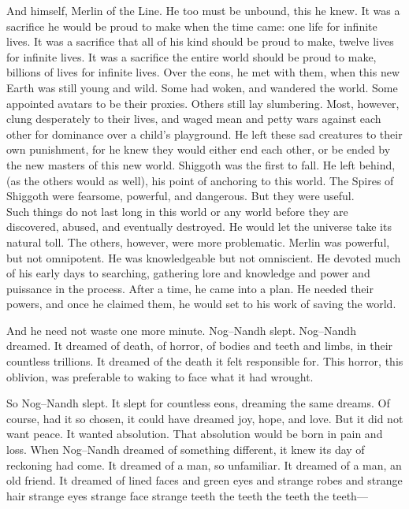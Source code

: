And himself, Merlin of the Line. He too must be unbound, this he knew. It was a sacrifice he would be proud to make when the time came: one life for infinite lives. It was a sacrifice that all of his kind should be proud to make, twelve lives for infinite lives. It was a sacrifice the entire world should be proud to make, billions of lives for infinite lives.
\SmallVSpace
Over the eons, he met with them, when this new Earth was still young and wild. Some had woken, and wandered the world. Some appointed avatars to be their proxies. Others still lay slumbering. Most, however, clung desperately to their lives, and waged mean and petty wars against each other for dominance over a child’s playground. He left these sad creatures to their own punishment, for he knew they would either end each other, or be ended by the new masters of this new world.
\SmallVSpace
Shiggoth was the first to fall. He left behind, (as the others would as well), his point of anchoring to this world. The Spires of Shiggoth were fearsome, powerful, and dangerous. But they were useful.\\Such things do not last long in this world or any world before they are discovered, abused, and eventually destroyed. He would let the universe take its natural toll.
\SmallVSpace
The others, however, were more problematic. Merlin was powerful, but not omnipotent. He was knowledgeable but not omniscient. He devoted much of his early days to searching, gathering lore and knowledge and power and puissance in the process. After a time, he came into a plan. He needed their powers, and once he claimed them, he would set to his work of saving the world.

And he need not waste one more minute.
\doubleline
Nog\mbox{--}Nandh slept. Nog\mbox{--}Nandh dreamed. It dreamed of death, of horror, of bodies and teeth and limbs, in their countless trillions. It dreamed of the death it felt responsible for. This horror, this oblivion, was preferable to waking to face what it had wrought.

So Nog\mbox{--}Nandh slept. It slept for countless eons, dreaming the same dreams. Of course, had it so chosen, it could have dreamed joy, hope, and love. But it did not want peace. It wanted absolution. That absolution would be born in pain and loss.
\SmallVSpace
When Nog\mbox{--}Nandh dreamed of something different, it knew its day of reckoning had come. It dreamed of a man, so unfamiliar. It dreamed of a man, an old friend. It dreamed of lined faces and green eyes and strange robes and strange hair strange eyes strange face strange teeth the teeth the teeth the teeth\mbox{---}

